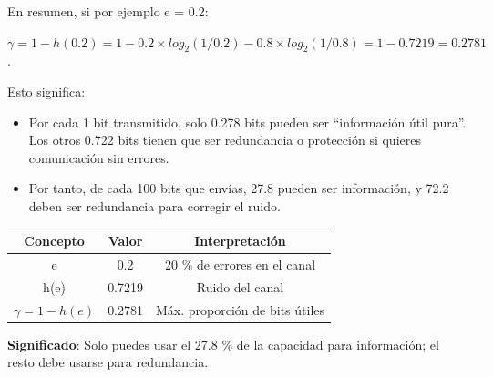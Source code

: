 \documentclass{beamer}
\theoremstyle{plain}
\theoremstyle{example}
\theoremstyle{example}
\begin{document}
\begin{frame}  \small  


En resumen, si por ejemplo e = 0.2:

\begin{center}
$\gamma = 1 - h(0.2)	= 1 - 0.2 \times  log_2(1/0.2) - 0.8 \times log_2(1/0.8) = 1 - 0.7219 = 0.2781$.
\end{center}


Esto significa:

\begin{itemize}
    \item Por cada 1 bit transmitido, solo 0.278 bits pueden ser ``información útil pura''. Los otros 0.722 bits tienen que ser redundancia o protección si quieres comunicación sin errores.
    \item Por tanto, de cada 100 bits que envías, 27.8 pueden ser información, y 72.2 deben ser redundancia para corregir el ruido.
\end{itemize}


\begin{table}
    \centering
    \begin{tabular}{ccc}
         \textbf{Concepto} & \textbf{Valor} & \textbf{Interpretación} \\\hline\hline
         e & 0.2 & 20 \% de errores en el canal\\
         h(e) & 0.7219 & Ruido del canal\\
         $\gamma =1 - h(e)$ &  0.2781 & Máx. proporción de bits útiles\\
    \end{tabular}
\end{table}

\textbf{Significado}: Solo puedes usar el 27.8 \% de la capacidad para información; el resto debe usarse para redundancia.

\end{frame} 
\end{document}
